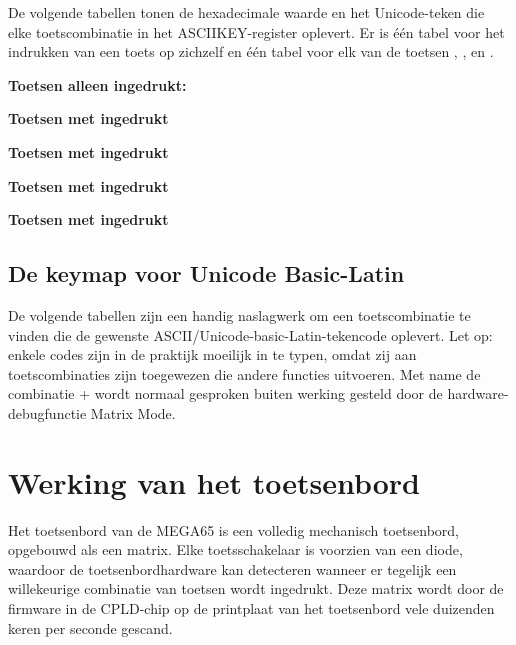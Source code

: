 De volgende tabellen tonen de hexadecimale waarde en het Unicode-teken die elke toetscombinatie in het ASCIIKEY-register oplevert. Er is één tabel voor het indrukken van een toets op zichzelf en één tabel voor elk van de toetsen , , \megasymbolkey en .

\begin{minipage}{\textwidth}
\bf{Toetsen alleen ingedrukt:}

\end{minipage}

\begin{minipage}{\textwidth}
\bf{Toetsen met  ingedrukt}

\end{minipage}

\begin{minipage}{\textwidth}
\bf{Toetsen met  ingedrukt}

\end{minipage}

\begin{minipage}{\textwidth}
\bf{Toetsen met \megasymbolkey ingedrukt}

\end{minipage}

\begin{minipage}{\textwidth}
\bf{Toetsen met  ingedrukt}

\end{minipage}

\subsection{De keymap voor Unicode Basic-Latin}

De volgende tabellen zijn een handig naslagwerk om een toetscombinatie te vinden die de gewenste ASCII/Unicode-basic-Latin-tekencode oplevert. Let op: enkele codes zijn in de praktijk moeilijk in te typen, omdat zij aan toetscombinaties zijn toegewezen die andere functies uitvoeren. Met name de combinatie \megasymbol +  wordt normaal gesproken buiten werking gesteld door de hardware-debugfunctie Matrix Mode.




\newpage
\section{Werking van het toetsenbord}

Het toetsenbord van de MEGA65 is een volledig mechanisch toetsenbord, opgebouwd als een matrix. Elke toetsschakelaar is voorzien van een diode, waardoor de toetsenbordhardware kan detecteren wanneer er tegelijk een willekeurige combinatie van toetsen wordt ingedrukt. Deze matrix wordt door de firmware in de CPLD-chip op de printplaat van het toetsenbord vele duizenden keren per seconde gescand.

